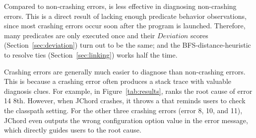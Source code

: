 
Compared to non-crashing errors, \ourtool is less effective
in diagnosing non-crashing errors.
This is a direct result of lacking enough predicate behavior observations,
since most crashing errors occur soon
after the program is launched. Therefore, many predicates are
only executed once and their $Deviation$ scores
 (Section~\ref{sec:deviation}) turn out to be the same; and the BFS-distance-heuristic to resolve ties (Section~\ref{sec:linking})
works half the time.




Crashing errors are generally much easier to diagnose than non-crashing errors.
This is because a crashing error often produces a stack trace with valuable diagnosis clues.
For example, in Figure~\ref{tab:results}, \ourtool ranks the root cause of
error 14  8th.
However, when JChord crashes, it throws a 
that reminds users to check the classpath setting. For the other three crashing errors (error 8, 10, and 11),
JChord even outputs the wrong configuration option value in the
error message, which
directly guides users to the root cause. 









